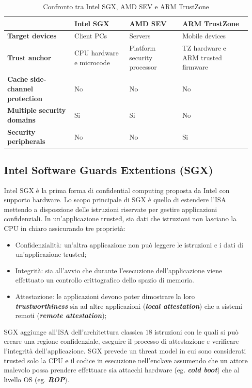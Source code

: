 \documentclass{article}
\begin{document}
\begin{table}
\centering
\begin{tabular}{|p{3cm}|p{3cm}|p{3cm}|p{3cm}|}
\hline
\textbf{} & \textbf{Intel SGX} & \textbf{AMD SEV} & \textbf{ARM TrustZone} \\ \hline
\textbf{Target devices} & Client PCs & Servers & Mobile devices  \\ \hline
\textbf{Trust anchor} & CPU hardware e microcode & Platform security processor & TZ hardware e ARM trusted firmware \\ \hline
\textbf{Cache side-channel protection} & No  & No  & No \\ \hline
\textbf{Multiple security domains} & Si & Si & No \\ \hline
\textbf{Security peripherals} & No & No & Si \\ \hline
\end{tabular}
\caption{Confronto tra Intel SGX, AMD SEV e ARM TrustZone}
\label{tab:tee-implementations}
\end{table}

\subsection{Intel Software Guards Extentions (SGX)}
Intel SGX è la prima forma di confidential computing proposta da Intel con supporto hardware. Lo scopo principale di SGX è quello di estendere l'ISA mettendo a disposzione delle istruzioni riservate per gestire applicazioni confidenziali. In un'applicazione trusted, sia dati che istruzioni non lasciano la CPU in chiaro assicurando tre proprietà:
\begin{itemize}
  \item Confidenzialità: un'altra applicazione non può leggere le istruzioni e i dati di un'applicazione trusted;
  \item Integrità: sia all'avvio che durante l'esecuzione dell'applicazione viene effettuato un controllo crittografico dello spazio di memoria. 
  \item Attestazione: le applicazioni devono poter dimostrare la loro \textbf{\textit{trustworthiness}} sia ad altre applicazioni (\textbf{\textit{local attestation}}) che a sistemi remoti (\textbf{\textit{remote attestation}});
\end{itemize}

SGX aggiunge all'ISA dell'architettura classica $18$ istruzioni con le quali si può creare una regione confidenziale, eseguire il processo di attestazione e verificare l'integrità dell'applicazione. 
SGX prevede un threat model in cui sono considerati trusted solo la CPU e il codice in esecuzione nell'enclave assumendo che un attore malevolo possa prendere effettuare sia attacchi hardware (eg. \textbf{\textit{cold boot}}) che al livello OS (eg. \textbf{\textit{ROP}}).
\end{document}
